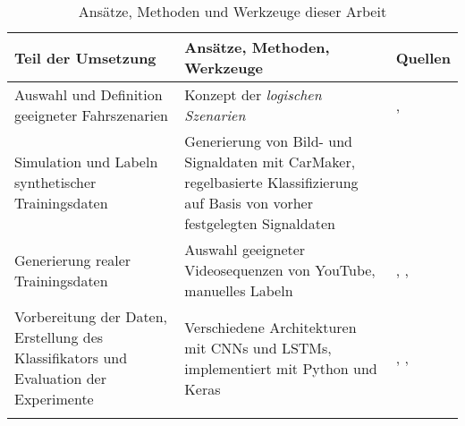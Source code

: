 \begin{longtable}[c]{p{5cm} p{6.5cm} p{1.5cm}}
\textbf{Teil der Umsetzung} & \textbf{Ansätze, Methoden, Werkzeuge} & \textbf{Quellen} \\
\hline
\endhead

Auswahl und Definition geeigneter Fahrszenarien & Konzept der \textit{logischen Szenarien} & \cite{ulbrich2015defining}, \cite{bagschik2017szenarien} \\
\hline
Simulation und Labeln synthetischer Trainingsdaten & Generierung von Bild- und Signaldaten mit CarMaker, regelbasierte Klassifizierung auf Basis von vorher festgelegten Signaldaten & \cite{ipg2018carmaker} \\
\hline
Generierung realer Trainingsdaten & Auswahl geeigneter Videosequenzen von YouTube, manuelles Labeln & \cite{youtube2018video}, \cite{google2018route1}, \cite{google2018route2} \\
\hline
Vorbereitung der Daten, Erstellung des Klassifikators und Evaluation der Experimente & Verschiedene Architekturen mit \acp{CNN} und \acp{LSTM}, implementiert mit Python und Keras & \cite{chollet2015keras}, \cite{lecun2010convolutional}, \cite{hochreiter1997long} \\

\hline
\caption{Ansätze, Methoden und Werkzeuge dieser Arbeit}
\label{tab_konzept_methods}
\end{longtable}




